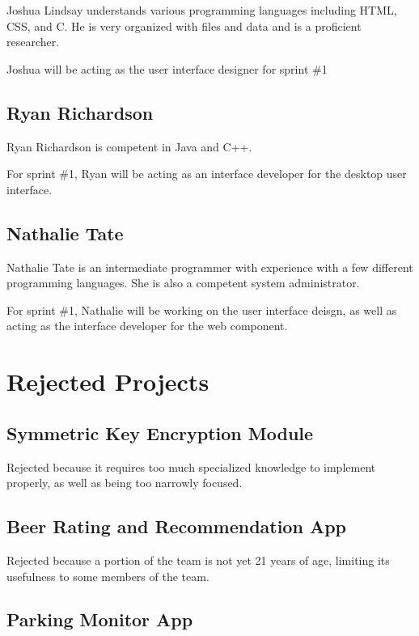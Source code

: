 \documentclass[11pt]{article}
\begin{document}
Joshua Lindsay understands various programming languages including
HTML, CSS, and C. He is very organized with files and data and is a
proficient researcher.

Joshua will be acting as the user interface designer for sprint \#1

\subsection{Ryan Richardson}
\label{sec-1-5}

Ryan Richardson is competent in Java and C++.

For sprint \#1, Ryan will be acting as an interface developer for the
desktop user interface.

\subsection{Nathalie Tate}
\label{sec-1-6}

Nathalie Tate is an intermediate programmer with experience with a few
different programming languages. She is also a competent system
administrator.

For sprint \#1, Nathalie will be working on the user interface deisgn,
as well as acting as the interface developer for the web component.

\section{Rejected Projects}
\label{sec-2}

\subsection{Symmetric Key Encryption Module}
\label{sec-2-1}

Rejected because it requires too much specialized knowledge to
implement properly, as well as being too narrowly focused.

\subsection{Beer Rating and Recommendation App}
\label{sec-2-2}

Rejected because a portion of the team is not yet 21 years of age,
limiting its usefulness to some members of the team.

\subsection{Parking Monitor App}
\label{sec-2-3}
\end{document}
